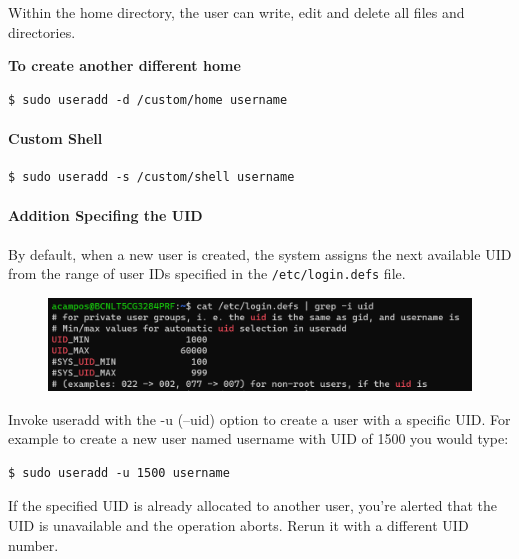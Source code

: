 \documentclass{article}
\newenvironment{blocktemplate}[1]{%
    \tcolorbox[beamer,%
    noparskip,breakable,
    colframe=Blue,%
    colbacklower=LimeGreen!75!LightGreen,%
    title=#1]}%
    {\endtcolorbox}
\newenvironment{blocktemplateIII}[1]{%
    \tcolorbox[beamer,%
    noparskip,breakable,
    ,colframe=Red,%
    colbacklower=LimeGreen!75!LightGreen,%
    title=#1]}%
    {\endtcolorbox}
\newenvironment{codetemplate}[1][]{%
  \mybasecolorbox[#1]
  \itshape
}{%
  \endmybasecolorbox
}
\begin{document}
\begin{blocktemplate}{NOTE}
Within the home directory, the user can write, edit and delete all files and directories.
\end{blocktemplate}

\textbf{To create another different home}
\begin{codetemplate}{}
\begin{verbatim}
$ sudo useradd -d /custom/home username
\end{verbatim}
\end{codetemplate}

\paragraph{Custom Shell}
\begin{codetemplate}{}
\begin{verbatim}
$ sudo useradd -s /custom/shell username
\end{verbatim}
\end{codetemplate}


\paragraph{Addition Specifing the UID}
By default, when a new user is created, the system assigns the next available UID from the range of user IDs specified in the \verb|/etc/login.defs| file.

\begin{figure}[H]
    \includegraphics[scale=0.7]{pictures/loginsfile.png}
    \centering
\end{figure}

Invoke useradd with the -u (--uid) option to create a user with a specific UID. For example to create a new user named username with UID of 1500 you would type:
\begin{codetemplate}{}
\begin{verbatim}
$ sudo useradd -u 1500 username
\end{verbatim}
\end{codetemplate}

\begin{blocktemplateIII}{WARNING}
If the specified UID is already allocated to another user, you're alerted that the UID is unavailable and the operation aborts. Rerun it with a different UID number.
\end{blocktemplateIII}
\end{document}
